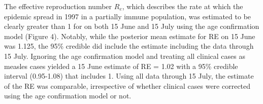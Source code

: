 The effective reproduction number $R_e$, which describes the rate at which the epidemic spread in 1997 in a partially immune population, was estimated to be clearly greater than 1 for on both 15 June and 15 July using the age confirmation model (Figure 4). Notably, while the posterior mean
estimate for RE on 15 June was 1.125, the 95\% credible did include the estimate including the data through 15 July. Ignoring the age
confirmation model and treating all clinical cases as measles cases yielded a 15 June estimate of RE = 1.02 with a 95\% credible interval
(0.95-1.08) that includes 1. Using all data through 15 July, the estimate of the RE was comparable, irrespective of whether clinical cases were corrected using the age confirmation model or not.